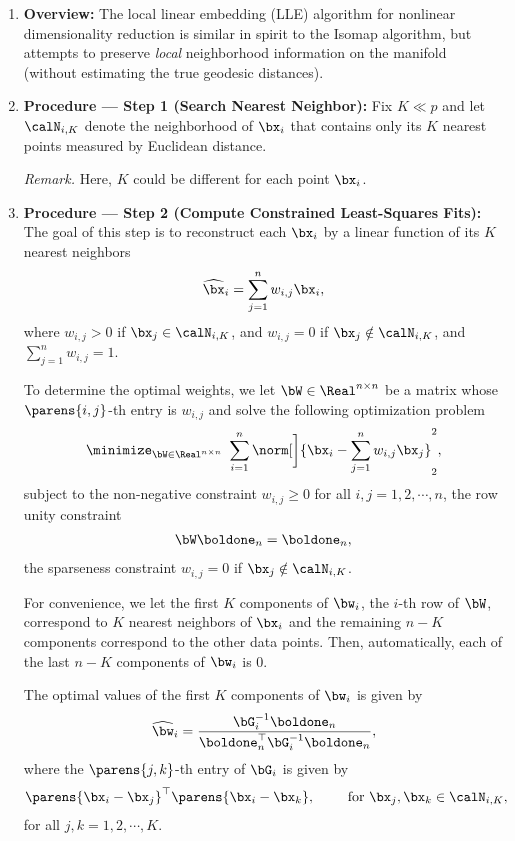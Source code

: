\documentclass[12pt]{article}
\begin{document}
\begin{enumerate}[label=\textbf{\arabic*.}]

	\item \textbf{Overview:} The local linear embedding (LLE) algorithm for nonlinear dimensionality reduction is similar in spirit to the Isomap algorithm, but attempts to preserve \emph{local} neighborhood information on the manifold (without estimating the true geodesic distances). 
	
	\item \textbf{Procedure --- Step 1 (Search Nearest Neighbor):} Fix $K \ll p$ and let $\calN_{i,K}$ denote the neighborhood of $\bx_i$ that contains only its $K$ nearest points measured by Euclidean distance. 
	
	\textit{Remark.} Here, $K$ could be different for each point $\bx_i$. 
	
	\item \textbf{Procedure --- Step 2 (Compute Constrained Least-Squares Fits):} The goal of this step is to reconstruct each $\bx_i$ by a linear function of its $K$ nearest neighbors 
	\begin{align*}
		\widehat{\bx}_i = \sum_{j=1}^n w_{i,j} \bx_i, 
	\end{align*}
	where $w_{i,j} > 0$ if $\bx_j \in \calN_{i,K}$, and $w_{i,j} = 0$ if $\bx_j \notin \calN_{i,K}$, and $\sum_{j=1}^{n} w_{i,j} = 1$. 
	
	To determine the optimal weights, we let $\bW \in \Real^{n \times n}$ be a matrix whose $\parens{i, j}$-th entry is $w_{i,j}$ and solve the following optimization problem 
	\begin{align}\label{eq-lle-weight}
		\minimize_{\bW \in \Real^{n \times n}} \ \sum_{i=1}^n \norm[\bigg]{\bx_i - \sum_{j=1}^n w_{i,j} \bx_j}_2^2, 
	\end{align}
	subject to the non-negative constraint $w_{i,j} \ge 0$ for all $i, j = 1, 2, \cdots, n$, the row unity constraint 
	\begin{align*}
		\bW \boldone_n = \boldone_n, 
	\end{align*}
	the sparseness constraint $w_{i,j} = 0$ if $\bx_j \notin \calN_{i,K}$. 
	
	For convenience, we let the first $K$ components of $\bw_i$, the $i$-th row of $\bW$, correspond to $K$ nearest neighbors of $\bx_i$ and the remaining $n-K$ components correspond to the other data points. Then, automatically, each of the last $n-K$ components of $\bw_i$ is 0. 
	
	The optimal values of the first $K$ components of $\bw_i$ is given by 
	\begin{align*}
		\widehat{\bw}_i = \frac{\bG_i^{-1} \boldone_n}{\boldone_n^\top \bG_i^{-1} \boldone_n}, 
	\end{align*}
	where the $\parens{j,k}$-th entry of $\bG_i$ is given by 
	\begin{align*}
		\parens{\bx_i - \bx_j}^\top \parens{\bx_i - \bx_k}, \qquad \text{ for } \bx_j, \bx_k \in \calN_{i,K}, 
	\end{align*}
	for all $j, k = 1, 2, \cdots, K$. 
	

\end{enumerate}
\end{document}
